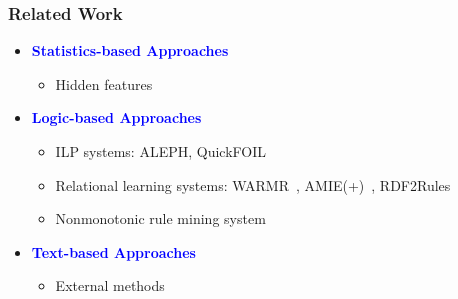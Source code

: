\documentclass{beamer}
\newcommand{\naf}{{\it not}\,}
\newcommand{\wrt}[0]{w.r.t.\ }
\newcommand{\bl}[1]{\textcolor{blue}{#1}}
\newcommand{\gr}[1]{\textcolor{darkgreen}{#1}}
\def\cG{\ensuremath{\mathcal{G}}}
\def\cR{\ensuremath{\mathcal{R}}}
\newcommand{\mi}[1]{\ensuremath{\mathit{#1}}}
\begin{document}
\begin{frame}\frametitle{Related Work}
\begin{itemize}
\item \textbf{\bl{Statistics-based Approaches}}
\begin{itemize}
\item Hidden features~\cite{rescal}
\end{itemize}
\medskip

\item \textbf{\bl{Logic-based Approaches}}
\begin{itemize}
\item ILP systems: ALEPH, QuickFOIL~\cite{quickfoil}
\item Relational learning systems: WARMR~\cite{warmr}, AMIE(+)~\cite{amie}, RDF2Rules~\cite{rdf2rules}
\item Nonmonotonic rule mining system~\cite{iswc2016}
\end{itemize}
\medskip


\item \textbf{\bl{Text-based Approaches}}
\begin{itemize}
\item External methods~\cite{match}
\end{itemize}
\medskip

\end{itemize}
\end{frame}




 

\end{document}
